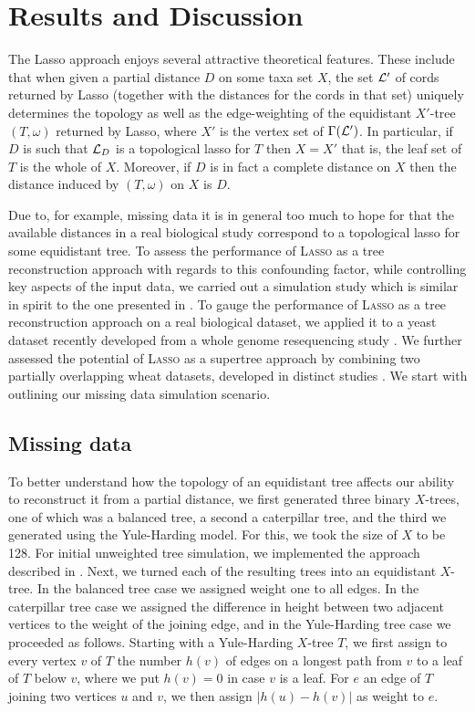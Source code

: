\section{Results and Discussion}
\label{sec:results}

The {\sc Lasso} approach enjoys several attractive theoretical features. These
include that when given a partial distance $D$ on some taxa set $X$, the set
${\mathcal L}'$ of cords returned by {\sc Lasso} (together with the distances for the
cords in that set) uniquely determines the topology as well as the
edge-weighting of the equidistant $X'$-tree $(T,\omega)$ returned by {\sc
  Lasso}, where $X'$ is the vertex set of $\Gamma({\mathcal L}')$.  In particular, if
$D$ is such that ${\mathcal L}_D$ is a topological lasso for $T$ then $X=X'$ that is,
the leaf set of $T$ is the whole of $X$.  Moreover, if $D$ is in fact a
complete distance on $X$ then the distance induced by $(T,\omega)$ on $X$ is
$D$.

Due to, for example, missing data it is in general too much to hope for that
the available distances in a real biological study correspond to a topological
lasso for some equidistant tree. To assess the performance of \textsc{Lasso}
as a tree reconstruction approach with regards to this confounding factor,
while controlling key aspects of the input data, we carried out a simulation
study which is similar in spirit to the one presented in
\cite{criscuolo2008fastnj}.  To gauge the performance of \textsc{Lasso} as a
tree reconstruction approach on a real biological dataset, we applied it to a
yeast dataset \cite{west14ribosomal} recently developed from a whole genome
resequencing study \cite{liti}. We further assessed the potential of
\textsc{Lasso} as a supertree approach by combining two partially overlapping
wheat datasets, developed in distinct studies \cite{gediflux, muge}.  We start
with outlining our missing data simulation scenario.

\subsection{Missing data}
\label{sec:missing-data-disc}

To better understand how the topology of an equidistant tree affects our
ability to reconstruct it from a partial distance, we first generated three
binary $X$-trees, one of which was a balanced tree, a second a caterpillar
tree, and the third we generated using the Yule-Harding model. For this, we
took the size of $X$ to be 128.  For initial unweighted tree simulation, we
implemented the approach described in \cite[Section 2.5]{semple2003phylogenetics}.  Next, we
turned each of the resulting trees into an equidistant $X$-tree. In the
balanced tree case we assigned weight one to all edges. In the caterpillar
tree case we assigned the difference in height between two adjacent vertices
to the weight of the joining edge, and in the Yule-Harding tree case we
proceeded as follows. Starting with a Yule-Harding $X$-tree $T$, we first
assign to every vertex $v$ of $T$ the number $h(v)$ of edges on a longest path
from $v$ to a leaf of $T$ below $v$, where we put $h(v)=0$ in case $v$ is a
leaf.  For $e$ an edge of $T$ joining two vertices $u$ and $v$, we then assign
$|h(u)-h(v)|$ as weight to $e$.

